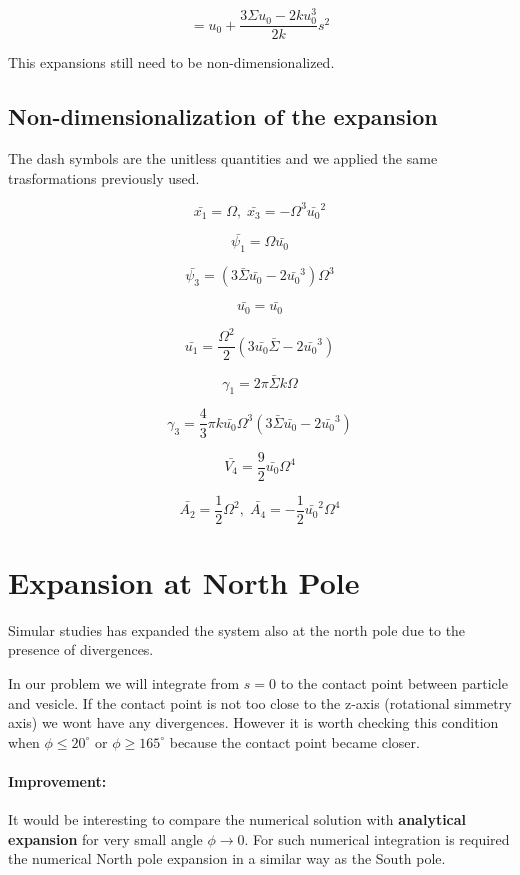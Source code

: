 \documentclass[12pt]{article}
\begin{document}
$$
= u_0  + \frac{3  \Sigma u_0 - 2  k u_0^3}{2 k }s^2
$$

This expansions still need to be non-dimensionalized.

\subsection{Non-dimensionalization of the expansion}
The dash symbols are the unitless quantities and we applied the same trasformations previously used.


$$
\bar{x_1} = \Omega ,\;  \bar{x_3} = - \Omega^3 \bar{u_0}^2 
$$

$$
\bar{\psi_1}  = \Omega \bar{u_0}
$$

$$
\bar{\psi_3} = (3\bar{\Sigma} \bar{u_0} - 2 \bar{u_0}^3)\Omega^3
$$

$$
\bar{u_0} = \bar{u_0} 
$$

$$
\bar{u_1} = \frac{\Omega^2}{2} (3\bar{u_0} \bar{\Sigma} - 2 \bar{u_0}^3) 
$$

$$
\gamma_1 = 2 \pi \bar{\Sigma} k \Omega 
$$

$$
\gamma_3 = \frac{4}{3} \pi k \bar{u_0} \Omega^3 (3 \bar{\Sigma} \bar{u_0} - 2 \bar{u_0}^3)
$$


$$
\bar{V_4} = \frac{9}{2}\bar{u_0} \Omega^4
$$

$$
\bar{A_2} = \frac{1}{2} \Omega^2 ,\; \bar{A_4} = -\frac{1}{2} \bar{u_0}^2 \Omega^4
$$

\section{Expansion at North Pole}
Simular studies \cite{freyMembraneAreaGain2022} \cite{christActiveShapeOscillations2021} has expanded the system also at the north pole due to the presence of divergences.

In our problem we will integrate from $s=0$ to the contact point between particle and vesicle. If the contact point is not too close to the z-axis (rotational simmetry axis) we wont have any divergences. However it is worth checking this condition when $\phi \leq 20^{\circ}$ or $\phi \geq 165^{\circ}$ because the contact point became closer.

\paragraph{Improvement:} It would be interesting to compare the numerical solution with \textbf{analytical expansion} for very small angle $\phi \to 0$. For such numerical integration is required the numerical North pole expansion in a similar way as the South pole.
\end{document}
